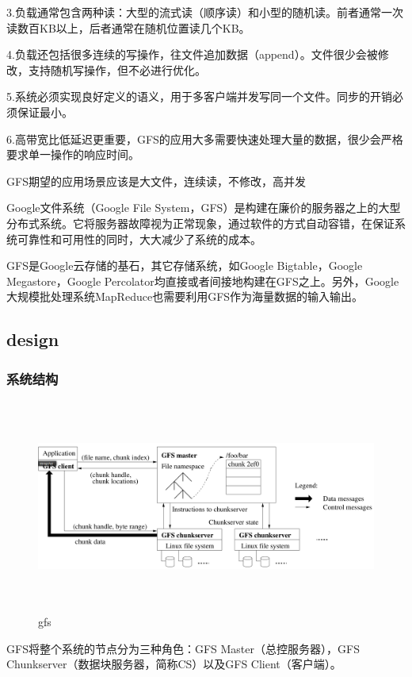 3.负载通常包含两种读：大型的流式读（顺序读）和小型的随机读。前者通常一次读数百KB以上，后者通常在随机位置读几个KB。

4.负载还包括很多连续的写操作，往文件追加数据（append）。文件很少会被修改，支持随机写操作，但不必进行优化。

5.系统必须实现良好定义的语义，用于多客户端并发写同一个文件。同步的开销必须保证最小。

6.高带宽比低延迟更重要，GFS的应用大多需要快速处理大量的数据，很少会严格要求单一操作的响应时间。

{\color{red}GFS期望的应用场景应该是大文件，连续读，不修改，高并发}

Google文件系统（Google File System，GFS）是构建在廉价的服务器之上的大型分布式系统。它将服务器故障视为正常现象，通过软件的方式自动容错，在保证系统可靠性和可用性的同时，大大减少了系统的成本。

GFS是Google云存储的基石，其它存储系统，如Google Bigtable，Google Megastore，Google Percolator均直接或者间接地构建在GFS之上。另外，Google大规模批处理系统MapReduce也需要利用GFS作为海量数据的输入输出。

\subsection{design}
\subsubsection{系统结构}
\begin{figure}[!ht]
    \centering
    \includegraphics[height=7cm,width= 15cm]{img/gfs.png}
    \caption{gfs}
\label{gfs}
\end{figure}

GFS将整个系统的节点分为三种角色：GFS Master（总控服务器），GFS Chunkserver（数据块服务器，简称CS）以及GFS Client（客户端）。

